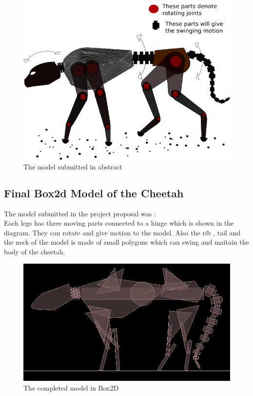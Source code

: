 \documentclass[11pt]{article}
\begin{document}
\begin{figure}[!ht]
	\centering
		\includegraphics[scale=0.6]{drawing.png}
		\caption{The model submitted in abstract}
\end{figure}
\subsection{Final Box2d Model of the Cheetah}
The model submitted in the project proposal was : \\
Each legs has three moving parts connected to a hinge which is shown in the diagram. They can rotate and give motion to the model. Also the rib , tail and the neck of the model is made of small polygons which can swing and maitain the body of the cheetah.

\begin{figure}[!ht]
	\centering
		\includegraphics[scale=0.4]{final.png}
		\caption{The completed model in Box2D}
\end{figure}
\end{document}
